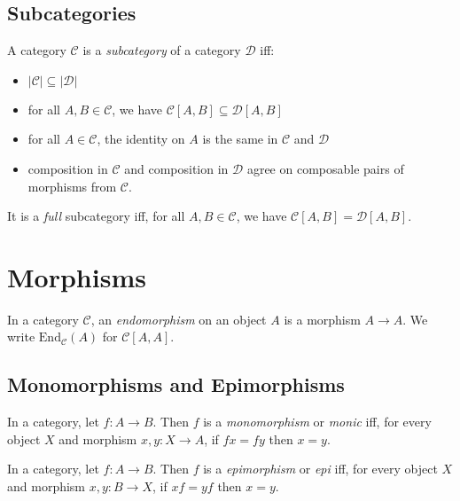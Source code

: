 


\section{Subcategories}

\begin{df}[Subcategory]
A category $\mathcal{C}$ is a \emph{subcategory} of a category $\mathcal{D}$ iff:
\begin{itemize}
\item $|\mathcal{C}| \subseteq |\mathcal{D}|$
\item for all $A,B \in \mathcal{C}$, we have $\mathcal{C}[A,B] \subseteq \mathcal{D}[A,B]$
\item for all $A \in \mathcal{C}$, the identity on $A$ is the same in $\mathcal{C}$ and $\mathcal{D}$
\item composition in $\mathcal{C}$ and composition in $\mathcal{D}$ agree on composable pairs of morphisms from $\mathcal{C}$.
\end{itemize}
It is a \emph{full} subcategory iff, for all $A, B \in \mathcal{C}$, we have $\mathcal{C}[A,B] = \mathcal{D}[A,B]$.
\end{df}

\chapter{Morphisms}

\begin{df}[Endomorphism]
    In a category $\mathcal{C}$, an \emph{endomorphism} on an object $A$ is a morphism $A \rightarrow A$. We write $\mathrm{End}_\mathcal{C}(A)$ for $\mathcal{C}[A,A]$.
\end{df}

\section{Monomorphisms and Epimorphisms}

\begin{df}[Monomorphism]
    In a category, let $f : A \rightarrow B$. Then $f$ is a \emph{monomorphism} or \emph{monic} iff, for every object $X$ and morphism $x,y : X \rightarrow A$, if $fx = fy$ then $x=y$.
\end{df}

\begin{df}[Epimorphism]
    In a category, let $f : A \rightarrow B$. Then $f$ is a \emph{epimorphism} or \emph{epi} iff, for every object $X$ and morphism $x,y : B \rightarrow X$, if $xf = yf$ then $x=y$.
\end{df}

